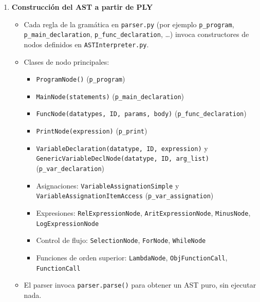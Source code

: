 \documentclass{article}
\begin{document}
\begin{enumerate}
  \item \textbf{Construcción del AST a partir de PLY}  
    \begin{itemize}
      \item Cada regla de la gramática en \texttt{parser.py} (por ejemplo \texttt{p\_program}, \texttt{p\_main\_declaration}, \texttt{p\_func\_declaration}, \ldots) invoca constructores de nodos definidos en \texttt{ASTInterpreter.py}.
      \item Clases de nodo principales:
        \begin{itemize}
          \item \texttt{ProgramNode()} (\texttt{p\_program})
          \item \texttt{MainNode(statements)} (\texttt{p\_main\_declaration})
          \item \texttt{FuncNode(datatypes, ID, params, body)} (\texttt{p\_func\_declaration})
          \item \texttt{PrintNode(expression)} (\texttt{p\_print})
          \item \texttt{VariableDeclaration(datatype, ID, expression)} y \texttt{GenericVariableDeclNode(datatype, ID, arg\_list)} (\texttt{p\_var\_declaration})
          \item Asignaciones: \texttt{VariableAssignationSimple} y \texttt{VariableAssignationItemAccess} (\texttt{p\_var\_assignation})
          \item Expresiones: \texttt{RelExpressionNode}, \texttt{AritExpressionNode}, \texttt{MinusNode}, \texttt{LogExpressionNode}
          \item Control de flujo: \texttt{SelectionNode}, \texttt{ForNode}, \texttt{WhileNode}
          \item Funciones de orden superior: \texttt{LambdaNode}, \texttt{ObjFunctionCall}, \texttt{FunctionCall}
        \end{itemize}
      \item El parser invoca \texttt{parser.parse()} para obtener un AST puro, sin ejecutar nada.
    \end{itemize}


\end{enumerate}
\end{document}
